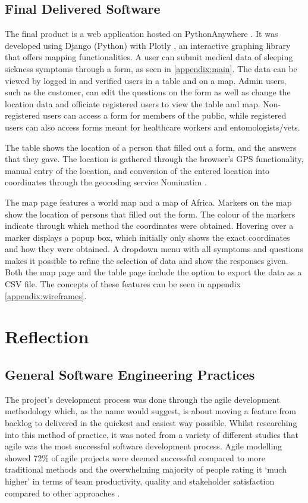 \documentclass{l3proj}
\begin{document}
\subsection{Final Delivered Software}
The final product \cite{TryAdvisor} is a web application hosted on PythonAnywhere \cite{PythonAnywhere}. It was developed using Django \cite{Django} (Python) with Plotly \cite{Plotly}, an interactive graphing library that offers mapping functionalities. A user can submit medical data of sleeping sickness symptoms through a form, as seen in \ref{appendix:main}. The data can be viewed by logged in and verified users in a table and on a map. Admin users, such as the customer, can edit the questions on the form as well as change the location data and officiate registered users to view the table and map. Non-registered users can access a form for members of the public, while registered users can also access forms meant for healthcare workers and entomologists/vets.

The table shows the location of a person that filled out a form, and the answers that they gave. The location is gathered through the browser's GPS functionality, manual entry of the location, and conversion of the entered location into coordinates through the geocoding service Nominatim \cite{Nominatim}.

The map page features a world map and a map of Africa. Markers on the map show the location of persons that filled out the form. The colour of the markers indicate through which method the coordinates were obtained. Hovering over a marker displays a popup box, which initially only shows the exact coordinates and how they were obtained. A dropdown menu with all symptoms and questions makes it possible to refine the selection of data and show the responses given. Both the map page and the table page include the option to export the data as a CSV file. The concepts of these features can be seen in appendix \ref{appendix:wireframes}.
\section{Reflection}
\label{sec:reflection}

\subsection{General Software Engineering Practices}
\label{subsec:practices}
The project's development process was done through the agile development methodology which, as the name would suggest, is about moving a feature from backlog to delivered in the quickest and easiest way possible. Whilst researching into this method of practice, it was noted from a variety of different studies that agile was the most successful software development process. Agile modelling showed 72\% of agile projects were deemed successful compared to more traditional methods and the overwhelming majority of people rating it `much higher' in terms of team productivity, quality and stakeholder satisfaction compared to other approaches \cite{AgileSuccess}.
\end{document}
